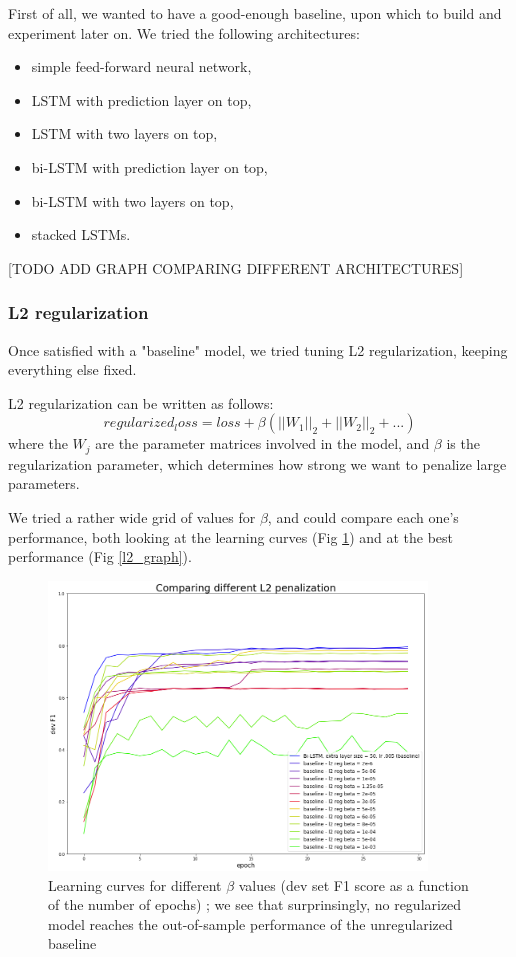 \documentclass{article} %
\begin{document}
First of all, we wanted to have a good-enough baseline, upon which to build and experiment later on. We tried the following architectures:
\begin{itemize}
\item simple feed-forward neural network,
\item LSTM with prediction layer on top,
\item LSTM with two layers on top,
\item bi-LSTM with prediction layer on top,
\item bi-LSTM with two layers on top,
\item stacked LSTMs.
\end{itemize}

[TODO ADD GRAPH COMPARING DIFFERENT ARCHITECTURES]

\subsubsection{L2 regularization}

Once satisfied with a "baseline" model, we tried tuning L2 regularization, keeping everything else fixed.

L2 regularization can be written as follows: $$regularized_loss = loss + \beta (||W_1||_2+||W_2||_2+...)$$ where the $W_j$ are the parameter matrices involved in the model, and $\beta$ is the regularization parameter, which determines how strong we want to penalize large parameters.

We tried a rather wide grid of values for $\beta$, and could compare each one's performance, both looking at the learning curves (Fig \ref{l2_devf1}) and at the best performance (Fig \ref{l2_graph}).


\begin{figure}
\begin{center}
\includegraphics[width=380px]{figs/l2_devf1.png}
\caption{Learning curves for different $\beta$ values (dev set F1 score as a function of the number of epochs) ; we see that surprinsingly, no regularized model reaches the out-of-sample performance of the unregularized baseline}
\label{l2_devf1}
\end{center}
\end{figure}
\end{document}
